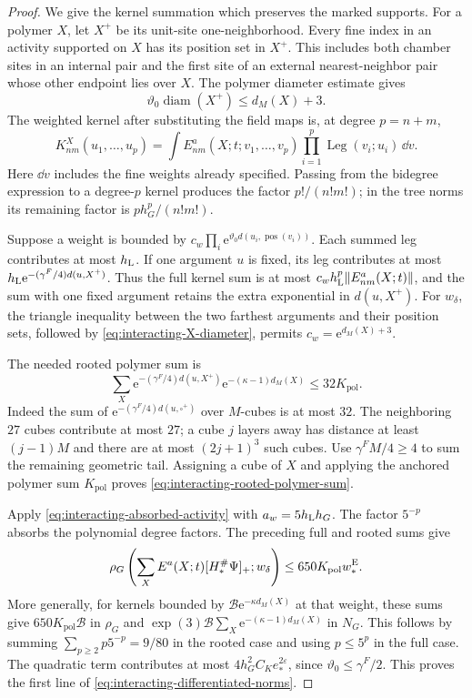 \begin{proof}
We give the kernel summation which preserves
the marked supports. For a polymer $X$, let
$X^+$ be its unit-site one-neighborhood.
Every fine index in an activity supported on
$X$ has its position set in $X^+$. This
includes both chamber sites in an internal
pair and the first site of an external
nearest-neighbor pair whose other endpoint
lies over $X$. The polymer diameter estimate
gives
\begin{equation}\label{eq:interacting-X-diameter}
 \vartheta_0\operatorname{diam}(X^+)\le d_M(X)+3 .
\end{equation}
The weighted kernel after substituting the
field maps is, at degree $p=n+m$,
\[
 K_{nm}^X(u_1,\ldots,u_p)=
 \int E^a_{nm}(X;t;v_1,\ldots,v_p)
           \prod_{i=1}^p\operatorname{Leg}(v_i;u_i)\,\dd v .
\]
Here $\dd v$ includes the fine weights already
specified. Passing from the bidegree expression
to a degree-$p$ kernel produces the factor
$p!/(n!m!)$; in the tree norms its remaining
factor is $p h_G^p/(n!m!)$.

Suppose a weight is bounded by
$c_w\prod_i \mathrm e^{\vartheta_0d(u_i,\operatorname{pos}(v_i))}$.
Each summed leg contributes at most $h_{\rm L}$.
If one argument $u$ is fixed, its leg contributes
at most
$h_{\rm L}\mathrm e^{-(\gamma^F/4)d(u,X^+)}$.
Thus the full kernel sum is at most
$c_wh_{\rm L}^p\|E^a_{nm}(X;t)\|$, and the
sum with one fixed argument retains the
extra exponential in $d(u,X^+)$.
For $w_\delta$, the triangle inequality between
the two farthest arguments and their position
sets, followed by \eqref{eq:interacting-X-diameter},
permits $c_w=\mathrm e^{d_M(X)+3}$.

The needed rooted polymer sum is
\begin{equation}\label{eq:interacting-rooted-polymer-sum}
 \sum_X \mathrm e^{-(\gamma^F/4)d(u,X^+)}
                       \mathrm e^{-(\kappa-1)d_M(X)}\le32K_{\mathrm{pol}}.
\end{equation}
Indeed the sum of
$\mathrm e^{-(\gamma^F/4)d(u,\square^+)}$ over $M$-cubes
is at most $32$. The neighboring $27$ cubes
contribute at most $27$; a cube $j$ layers
away has distance at least $(j-1)M$ and there
are at most $(2j+1)^3$ such cubes.
Use $\gamma^FM/4\ge4$ to sum the remaining
geometric tail. Assigning a cube of $X$
and applying the anchored polymer sum $K_{\mathrm{pol}}$
proves \eqref{eq:interacting-rooted-polymer-sum}.

Apply \eqref{eq:interacting-absorbed-activity}
with $a_w=5h_{\rm L}h_G$. The factor $5^{-p}$
absorbs the polynomial degree factors.
The preceding full and rooted sums give
\[
 \rho_G\left(\sum_X E^a(X;t)[H_*^\#\Psi]_+;w_\delta\right)
                                       \le650K_{\mathrm{pol}}w_*^{\rm E}.
\]
More generally, for kernels bounded by
$\mathcal B \mathrm e^{-\kappa d_M(X)}$ at that
weight, these sums give
$650K_{\mathrm{pol}}\mathcal B$ in $\rho_G$ and
$\exp(3)\mathcal B\sum_X\mathrm e^{-(\kappa-1)d_M(X)}$
in $N_G$. This follows by summing
$\sum_{p\ge2}p5^{-p}=9/80$ in the rooted
case and using $p\le5^p$ in the full case.
The quadratic term contributes at most
$4h_G^2C_Ke_*^{2\varepsilon}$, since
$\vartheta_0\le\gamma^F/2$. This proves the
first line of \eqref{eq:interacting-differentiated-norms}.


\end{proof}
